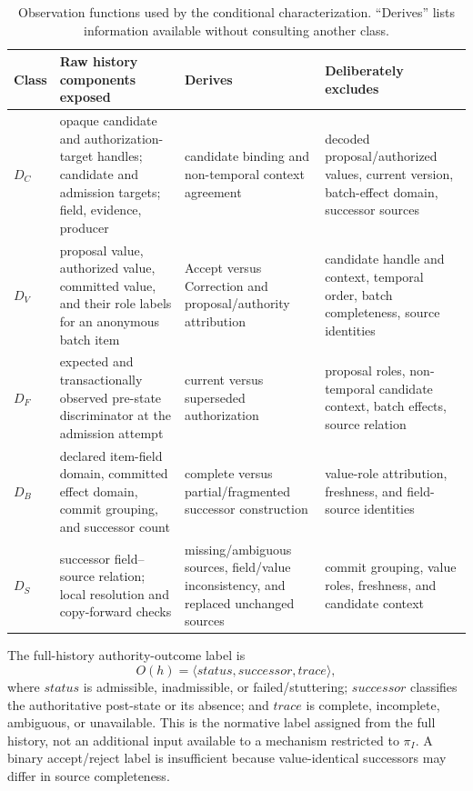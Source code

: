 \begin{table}[t]
\centering
\footnotesize
\caption{Observation functions used by the conditional characterization. ``Derives'' lists information available without consulting another class.}
\label{tab:observation-functions}
\begin{tabularx}{\textwidth}{@{}l>{\raggedright\arraybackslash}p{}>{\raggedright\arraybackslash}p{}>{\raggedright\arraybackslash}X@{}}
\toprule
Class & Raw history components exposed & Derives & Deliberately excludes \\
\midrule
$D_C$ & opaque candidate and authorization-target handles; candidate and admission targets; field, evidence, producer & candidate binding and non-temporal context agreement & decoded proposal/authorized values, current version, batch-effect domain, successor sources \\
$D_V$ & proposal value, authorized value, committed value, and their role labels for an anonymous batch item & Accept versus Correction and proposal/authority attribution & candidate handle and context, temporal order, batch completeness, source identities \\
$D_F$ & expected and transactionally observed pre-state discriminator at the admission attempt & current versus superseded authorization & proposal roles, non-temporal candidate context, batch effects, source relation \\
$D_B$ & declared item-field domain, committed effect domain, commit grouping, and successor count & complete versus partial/fragmented successor construction & value-role attribution, freshness, and field-source identities \\
$D_S$ & successor field--source relation; local resolution and copy-forward checks & missing/ambiguous sources, field/value inconsistency, and replaced unchanged sources & commit grouping, value roles, freshness, and candidate context \\
\bottomrule
\end{tabularx}
\end{table}

The full-history authority-outcome label is
\begin{equation}
O(h)=\langle status,successor,trace\rangle,
\label{eq:outcome}
\end{equation}
where $status$ is admissible, inadmissible, or failed/stuttering; $successor$ classifies the authoritative post-state or its absence; and $trace$ is complete, incomplete, ambiguous, or unavailable. This is the normative label assigned from the full history, not an additional input available to a mechanism restricted to $\pi_I$. A binary accept/reject label is insufficient because value-identical successors may differ in source completeness.

